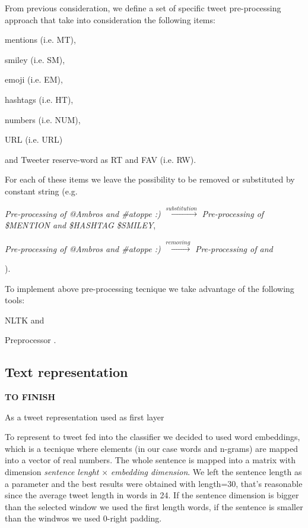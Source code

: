 From previous consideration, we define a set of specific tweet pre-processing approach that take into consideration the following items:
\begin{enumerate*}
\item mentions (i.e. MT),
\item smiley (i.e. SM),
\item emoji (i.e. EM),
\item hashtags (i.e. HT),
\item numbers (i.e. NUM),
\item URL (i.e. URL)
\item and Tweeter reserve-word as RT and FAV (i.e. RW).
\end{enumerate*}

For each of these items we leave the possibility to be removed or substituted by constant string (e.g.
\begin{enumerate*}
\item \emph{Pre-processing of @Ambros and \#atoppe :)} $\xrightarrow{substitution} $ \emph{Pre-processing of \$MENTION and \$HASHTAG \$SMILEY},
\item \emph{Pre-processing of @Ambros and \#atoppe :)} $\xrightarrow{removing} $ \emph{Pre-processing of and}
\end{enumerate*}
).

To implement above pre-processing tecnique we take advantage of the following tools:
\begin{enumerate*}
\item NLTK \cite{nltk} and 
\item Preprocessor \cite{tweets-preprocessor}.
\end{enumerate*}



\subsection{Text representation} \label{subsec:representation}

\textbf{TO FINISH}

As a tweet representation used as first layer

To represent to tweet fed into the classifier we decided to used word embeddings, which is a tecnique where elements (in our case words and n-grams) are mapped into a vector of real numbers.
The whole sentence is mapped into a matrix with dimension \emph{sentence lenght} $\times$ \emph{embedding dimension}.
We left the sentence length as a parameter and the best results were obtained with length=30, that's reasonable since the average tweet length in words in 24.
If the sentence dimension is bigger than the selected window we used the first length words, if the sentence is smaller than the windwos we used 0-right padding.

